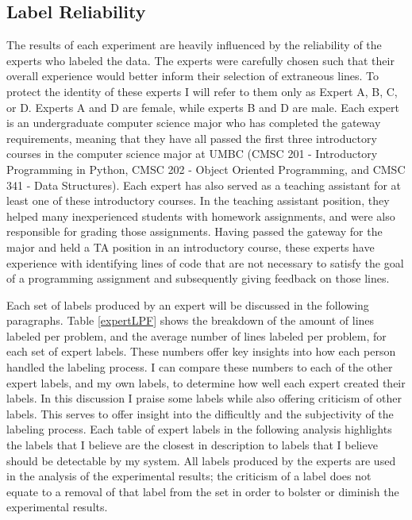 \documentclass[draft]{article}
\begin{document}

\subsection{Label Reliability}

The results of each experiment are heavily influenced by the reliability of the experts who labeled the data. The experts were carefully chosen such that their overall experience would better inform their selection of extraneous lines. To protect the identity of these experts I will refer to them only as Expert A, B, C, or D. Experts A and D are female, while experts B and D are male. Each expert is an undergraduate computer science major who has completed the gateway requirements, meaning that they have all passed the first three introductory courses in the computer science major at UMBC (CMSC 201 - Introductory Programming in Python, CMSC 202 - Object Oriented Programming, and CMSC 341 - Data Structures). Each expert has also served as a teaching assistant for at least one of these introductory courses. In the teaching assistant position, they helped many inexperienced students with homework assignments, and were also responsible for grading those assignments. Having passed the gateway for the major and held a TA position in an introductory course, these experts have experience with identifying lines of code that are not necessary to satisfy the goal of a programming assignment and subsequently giving feedback on those lines.



Each set of labels produced by an expert will be discussed in the following paragraphs. Table \ref{expertLPF} shows the breakdown of the amount of lines labeled per problem, and the average number of lines labeled per problem, for each set of expert labels. These numbers offer key insights into how each person handled the labeling process. I can compare these numbers to each of the other expert labels, and my own labels, to determine how well each expert created their labels. In this discussion I praise some labels while also offering criticism of other labels. This serves to offer insight into the difficultly and the subjectivity of the labeling process. Each table of expert labels in the following analysis highlights the labels that I believe are the closest in description to labels that I believe should be detectable by my system. All labels produced by the experts are used in the analysis of the experimental results; the criticism of a label does not equate to a removal of that label from the set in order to bolster or diminish the experimental results. 
\end{document}

